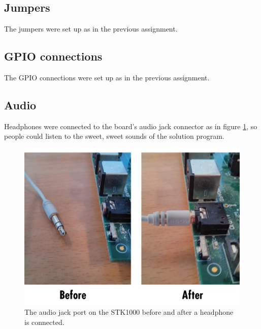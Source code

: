 \subsection{Jumpers}

The jumpers were set up as in the previous assignment.\cite{tdt4258-1}

\subsection{GPIO connections}

The GPIO connections were set up as in the previous assignment.\cite{tdt4258-1}

\subsection{Audio}

Headphones were connected to the board's audio jack connector as in figure \ref{img-audiojack}, so people could listen to the sweet, sweet sounds of the solution program.

\begin{figure}[H]
	\includegraphics[width = \textwidth]{images/audiojack.png}
	\caption{The audio jack port on the STK1000 before and after a headphone is connected.}
	\label{img-audiojack}
\end{figure}

